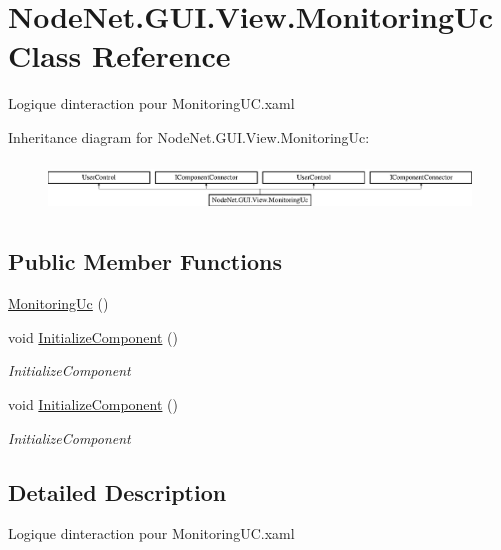 \hypertarget{class_node_net_1_1_g_u_i_1_1_view_1_1_monitoring_uc}{}\section{Node\+Net.\+G\+U\+I.\+View.\+Monitoring\+Uc Class Reference}
\label{class_node_net_1_1_g_u_i_1_1_view_1_1_monitoring_uc}


Logique d\textquotesingle{}interaction pour Monitoring\+U\+C.\+xaml  


Inheritance diagram for Node\+Net.\+G\+U\+I.\+View.\+Monitoring\+Uc\+:\begin{figure}[H]
\begin{center}
\leavevmode
\includegraphics[height=1.372549cm]{class_node_net_1_1_g_u_i_1_1_view_1_1_monitoring_uc}
\end{center}
\end{figure}
\subsection*{Public Member Functions}
\begin{DoxyCompactItemize}
\item 
\hyperlink{class_node_net_1_1_g_u_i_1_1_view_1_1_monitoring_uc_a5a80a2f25aebbb278d079bee02f338e8}{Monitoring\+Uc} ()
\item 
void \hyperlink{class_node_net_1_1_g_u_i_1_1_view_1_1_monitoring_uc_a6704bf9d913a2e0c4c413ff02f9a6849}{Initialize\+Component} ()
\begin{DoxyCompactList}\small\item\em Initialize\+Component \end{DoxyCompactList}\item 
void \hyperlink{class_node_net_1_1_g_u_i_1_1_view_1_1_monitoring_uc_a6704bf9d913a2e0c4c413ff02f9a6849}{Initialize\+Component} ()
\begin{DoxyCompactList}\small\item\em Initialize\+Component \end{DoxyCompactList}\end{DoxyCompactItemize}


\subsection{Detailed Description}
Logique d\textquotesingle{}interaction pour Monitoring\+U\+C.\+xaml 

